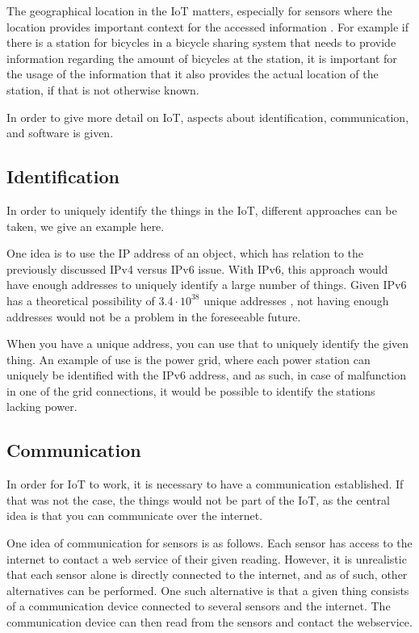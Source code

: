The geographical location in the IoT matters, especially for sensors where the location provides important context for the accessed information \citep{misc:locationMatters}.
For example if there is a station for bicycles in a bicycle sharing system that needs to provide information regarding the amount of bicycles at the station, it is important for the usage of the information that it also provides the actual location of the station, if that is not otherwise known.

In order to give more detail on IoT, aspects about identification, communication, and software is given.

\subsection{Identification}
In order to uniquely identify the things in the IoT, different approaches can be taken, we give an example here.

One idea is to use the IP address of an object, which has relation to the previously discussed IPv4 versus IPv6 issue.
With IPv6, this approach would have enough addresses to uniquely identify a large number of things.
Given IPv6 has a theoretical possibility of $3.4 \cdot 10^{38}$ unique addresses \citep{misc:ipv6}, not having enough addresses would not be a problem in the foreseeable future.

When you have a unique address, you can use that to uniquely identify the given thing.
An example of use is the power grid, where each power station can uniquely be identified with the IPv6 address, and as such, in case of malfunction in one of the grid connections, it would be possible to identify the stations lacking power.

\subsection{Communication}
In order for IoT to work, it is necessary to have a communication established.
If that was not the case, the things would not be part of the IoT, as the central idea is that you can communicate over the internet.

One idea of communication for sensors is as follows.
Each sensor has access to the internet to contact a web service of their given reading.
However, it is unrealistic that each sensor alone is directly connected to the internet, and as of such, other alternatives can be performed.
One such alternative is that a given thing consists of a communication device connected to several sensors and the internet.
The communication device can then read from the sensors and contact the webservice.

